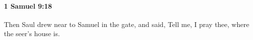 
		\paragraph{1 Samuel 9:18} %
			\label{1SAMUEL-9-18}

			Then Saul drew near to Samuel in the gate, and said, Tell me, I pray thee, where the seer’s house is.


